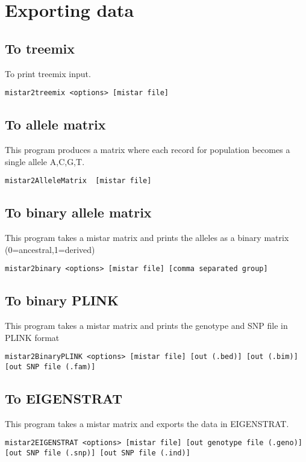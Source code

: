 \documentclass[a4paper]{article}
\begin{document}
\section{Exporting data}
\subsection{To treemix}

To print treemix input.
\begin{verbatim}
mistar2treemix <options> [mistar file]
\end{verbatim}

\subsection{To allele matrix}

This program produces a matrix where each record for population becomes a single allele {A,C,G,T}.
\begin{verbatim}
mistar2AlleleMatrix  [mistar file]
\end{verbatim}


\subsection{To binary allele matrix}

This program takes a mistar matrix and prints the alleles as a binary matrix (0=ancestral,1=derived)

\begin{verbatim}
mistar2binary <options> [mistar file] [comma separated group]
\end{verbatim}

\subsection{To binary PLINK}

This program takes a mistar matrix and prints the genotype and SNP file in PLINK format

\tiny
\begin{verbatim}
mistar2BinaryPLINK <options> [mistar file] [out (.bed)] [out (.bim)] [out SNP file (.fam)]
\end{verbatim}
\normalsize

\subsection{To EIGENSTRAT}
This program takes a mistar matrix and exports the data in EIGENSTRAT.
\tiny
\begin{verbatim}
mistar2EIGENSTRAT <options> [mistar file] [out genotype file (.geno)] [out SNP file (.snp)] [out SNP file (.ind)]
\end{verbatim}
\normalsize
\end{document}
